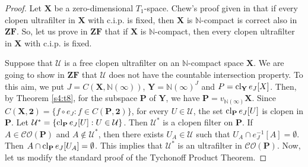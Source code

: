 \documentclass[12pt,twoside,leqno]{article}
\theoremstyle{plain}
\theoremstyle{definition}
\theoremstyle{remark}
\DeclareMathOperator{\cl}{{\rm cl}}
\begin{document}
\begin{proof}
	Let $\mathbf{X}$ be a zero-dimensional $T_1$-space. Chew's proof given in \cite{Chew} that if every clopen ultrafilter in $\mathbf{X}$ with c.i.p. is fixed, then $\mathbf{X}$ is $\mathbb{N}$-compact is correct also in $\mathbf{ZF}$. So, let us prove in $\mathbf{ZF}$ that if $\mathbf{X}$ is $\mathbb{N}$-compact, then every clopen ultrafilter in $\mathbf{X}$ with c.i.p. is fixed. 
	
	Suppose that $\mathcal{U}$ is a free clopen ultrafilter on an $\mathbb{N}$-compact space $\mathbf{X}$. We are going to show in $\mathbf{ZF}$ that $\mathcal{U}$ does not have the countable intersection property. To this aim, we put $J= C(\mathbf{X}, \mathbb{N}(\infty))$, $\mathbf{Y}=\mathbb{N}(\infty)^{J}$ and $P=\cl_{\mathbf{Y}}e_J[X]$. Then, by Theorem \ref{s4:t8}, for the subspace $\mathbf{P}$ of $\mathbf{Y}$, we  have $\mathbf{P}=v_{\mathbb{N}(\infty)}\mathbf{X}$. Since $C(\mathbf{X}, \mathbf{2})=\{f\circ e_J: f\in C(\mathbf{P}, \mathbf{2})\}$, for every $U\in\mathcal{U}$, the set $\cl_{\mathbf{P}}e_J[U]$ is clopen in $\mathbf{P}$. Let $\mathcal{U}^{\ast}=\{\cl_{\mathbf{P}}e_J[U]: U\in\mathcal{U}\}$. Then $\mathcal{U}^{\ast}$ is a clopen filter on $\mathbf{P}$. If $A\in\mathcal{CO}(\mathbf{P})$ and $A\notin\mathcal{U}^{\ast}$, then there exists $U_A\in\mathcal{U}$ such that $U_A\cap e_J^{-1}[A]=\emptyset$. Then $A\cap\cl_{\mathbf{P}}e_J[U_A]=\emptyset$. This implies that $\mathcal{U}^{\ast}$ is an ultrafilter in $\mathcal{CO}(\mathbf{P})$. Now, let us modify the standard proof of the Tychonoff Product Theorem.  
	

\end{proof}
\end{document}
